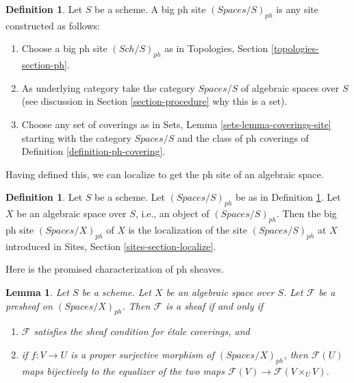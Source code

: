 \documentclass{stacks-project}
\theoremstyle{plain}
\newtheorem{lemma}[subsection]{Lemma}
\theoremstyle{definition}
\newtheorem{definition}[subsection]{Definition}
\theoremstyle{remark}
\numberwithin{equation}{subsection}
\def\Sch{\mathit{Sch}}
\begin{document}
\begin{definition}
\label{definition-big-ph-site}
Let $S$ be a scheme. A big ph site {\it $(\textit{Spaces}/S)_{ph}$}
is any site constructed as follows:
\begin{enumerate}
\item Choose a big ph site $(\Sch/S)_{ph}$ as in
Topologies, Section \ref{topologies-section-ph}.
\item As underlying category take the category $\textit{Spaces}/S$
of algebraic spaces over $S$ (see discussion in
Section \ref{section-procedure} why this is a set).
\item Choose any set of coverings as in
Sets, Lemma \ref{sets-lemma-coverings-site} starting with the
category $\textit{Spaces}/S$ and the class of ph coverings
of Definition \ref{definition-ph-covering}.
\end{enumerate}
\end{definition}

\noindent
Having defined this, we can localize to get the ph
site of an algebraic space.

\begin{definition}
\label{definition-big-small-ph}
Let $S$ be a scheme. Let $(\textit{Spaces}/S)_{ph}$ be as in
Definition \ref{definition-big-ph-site}.
Let $X$ be an algebraic space over $S$, i.e., an object of
$(\textit{Spaces}/S)_{ph}$. Then the big ph site
{\it $(\textit{Spaces}/X)_{ph}$} of $X$
is the localization of the site $(\textit{Spaces}/S)_{ph}$
at $X$ introduced in Sites, Section \ref{sites-section-localize}.
\end{definition}

\noindent
Here is the promised characterization of ph sheaves.

\begin{lemma}
\label{lemma-characterize-sheaf}
Let $S$ be a scheme. Let $X$ be an algebraic space over $S$.
Let $\mathcal{F}$ be a presheaf on $(\textit{Spaces}/X)_{ph}$.
Then $\mathcal{F}$ is a sheaf if and only if
\begin{enumerate}
\item $\mathcal{F}$ satisfies the sheaf condition for \'etale coverings, and
\item if $f : V \to U$ is a proper surjective morphism of
$(\textit{Spaces}/X)_{ph}$, then
$\mathcal{F}(U)$ maps bijectively to the equalizer
of the two maps $\mathcal{F}(V) \to \mathcal{F}(V \times_U V)$.
\end{enumerate}
\end{lemma}
\end{document}
